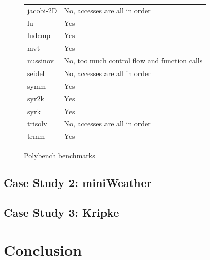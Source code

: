 \documentclass[sigconf, table]{acmart}
\begin{document}
\begin{figure}
\begin{tabular}{ll}
jacobi-2D   & No, accesses are all in order           \\
lu          & Yes         \\
ludcmp      & Yes          \\
mvt         & Yes          \\
nussinov    & No, too much control flow and function calls          \\
seidel      & No, accesses are all in order           \\
symm        & Yes          \\
syr2k       & Yes          \\
syrk        & Yes          \\
trisolv     & No, accesses are all in order           \\
trmm        & Yes         
\end{tabular}
\caption{Polybench benchmarks}
\end{figure}


\subsection{Case Study 2: miniWeather}

\subsection{Case Study 3: Kripke}


\section{Conclusion}
\end{document}
